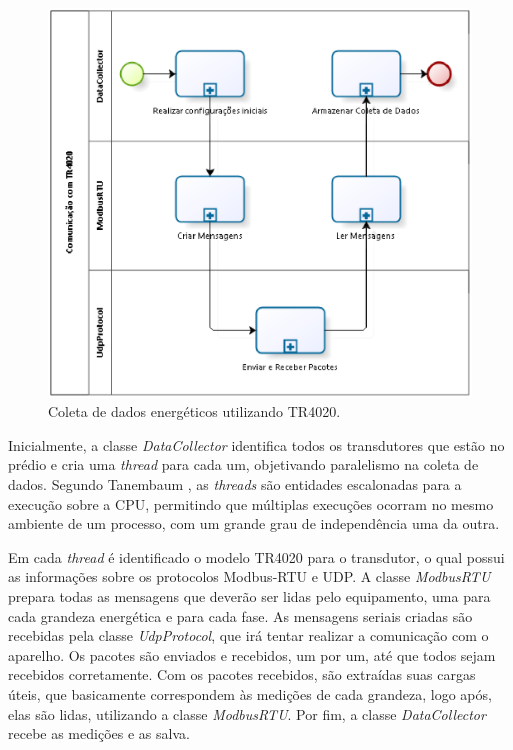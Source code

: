 \begin{figure}[!h]
    \centering
    \includegraphics[keepaspectratio=true,scale=1.0]{figuras/process_1.eps}
    \caption{Coleta de dados energéticos utilizando TR4020.}
    \label{process_1}
\end{figure}

Inicialmente, a classe \textit{DataCollector} identifica todos os transdutores que estão no prédio e cria uma \textit{thread} para cada um, objetivando paralelismo na coleta de dados. Segundo Tanembaum \cite{tanenbaum_2007}, as \textit{threads} são entidades escalonadas para a execução sobre a CPU, permitindo que múltiplas execuções ocorram no mesmo ambiente de um processo, com um grande grau de independência uma da outra.

Em cada \textit{thread} é identificado o modelo TR4020 para o transdutor, o qual possui as informações sobre os protocolos Modbus-RTU e UDP. A classe \textit{ModbusRTU} prepara todas as mensagens que deverão ser lidas pelo equipamento, uma para cada grandeza energética e para cada fase. As mensagens seriais criadas são recebidas pela classe \textit{UdpProtocol}, que irá tentar realizar a comunicação com o aparelho. Os pacotes são enviados e recebidos, um por um, até que todos sejam recebidos corretamente. Com os pacotes recebidos, são extraídas suas cargas úteis, que basicamente correspondem às medições de cada grandeza, logo após, elas são lidas, utilizando a classe \textit{ModbusRTU}. Por fim, a classe \textit{DataCollector} recebe as medições e as salva.

